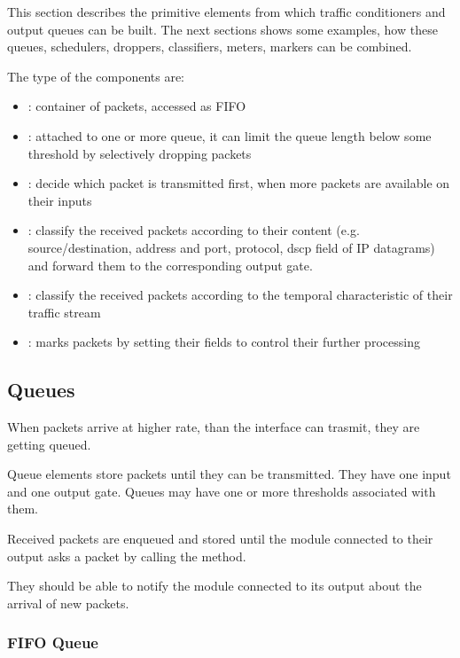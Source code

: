 This section describes the primitive elements from which traffic
conditioners and output queues can be built. The next sections
shows some examples, how these queues, schedulers, droppers,
classifiers, meters, markers can be combined.

The type of the components are:
\begin{itemize}
  \item {}: container of packets, accessed as FIFO
  \item {}: attached to one or more queue, it can
    limit the queue length below some threshold
    by selectively dropping packets
  \item {}: decide which packet is transmitted first,
     when more packets are available on their inputs
  \item {}: classify the received packets
     according to their content (e.g. source/destination,
     address and port, protocol, dscp field of IP datagrams)
     and forward them to the corresponding output gate.
  \item {}: classify the received packets
      according to the temporal characteristic of their
      traffic stream
  \item {}: marks packets by setting their fields
      to control their further processing
\end{itemize}

\subsection{Queues}
\label{sec:diffserv:queues}

When packets arrive at higher rate, than the interface can trasmit,
they are getting queued.


Queue elements store packets until they can be transmitted.
They have one input and one output gate.
Queues may have one or more thresholds associated with them.

 Received packets
are enqueued and stored until the module connected to their
output asks a packet by calling the 
method.

They should be able to notify the module connected to its output
about the arrival of new packets.

\subsubsection{FIFO Queue}
\label{sec:diffserv:fifo-queue}

